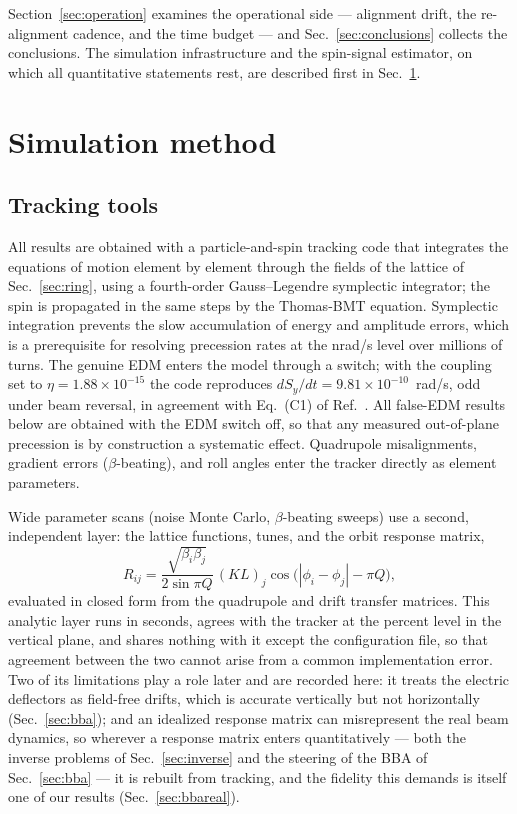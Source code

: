 \documentclass[aps,prab,reprint,superscriptaddress,nofootinbib]{revtex4-2}
\begin{document}
Section~\ref{sec:operation} examines the operational side --- alignment drift,
the re-alignment cadence, and the time budget --- and
Sec.~\ref{sec:conclusions} collects the conclusions.  The simulation
infrastructure and the spin-signal estimator, on which all quantitative
statements rest, are described first in Sec.~\ref{sec:method}.


\section{Simulation method}
\label{sec:method}

\subsection{Tracking tools}
\label{sec:tools}

All results are obtained with a particle-and-spin tracking code that
integrates the equations of motion element by element through the fields of
the lattice of Sec.~\ref{sec:ring}, using a fourth-order Gauss--Legendre
symplectic integrator; the spin is propagated in the same steps by the
Thomas-BMT equation.  Symplectic integration prevents the slow accumulation of
energy and amplitude errors, which is a prerequisite for resolving precession
rates at the nrad/s level over millions of turns.  The genuine EDM enters the
model through a switch; with the coupling set to
$\eta = 1.88\times10^{-15}$ the code reproduces
$dS_y/dt = 9.81\times10^{-10}$~rad/s, odd under beam reversal, in agreement
with Eq.~(C1) of Ref.~\cite{omarov}.  All false-EDM results below are obtained
with the EDM switch off, so that any measured out-of-plane precession is by
construction a systematic effect.  Quadrupole misalignments, gradient errors
($\beta$-beating), and roll angles enter the tracker directly as element
parameters.

Wide parameter scans (noise Monte Carlo, $\beta$-beating sweeps) use a second,
independent layer: the lattice functions, tunes, and the orbit response
matrix,
\begin{equation}
  R_{ij} = \frac{\sqrt{\beta_i\beta_j}}{2\sin\pi Q}\,(KL)_j
  \cos\!\big(|\phi_i-\phi_j| - \pi Q\big),
  \label{eq:R}
\end{equation}
evaluated in closed form from the quadrupole and drift transfer matrices.
This analytic layer runs in seconds, agrees with the tracker at the percent
level in the vertical plane, and shares nothing with it except the
configuration file, so that agreement between the two cannot arise from a
common implementation error.  Two of its limitations play a role later and are
recorded here: it treats the electric deflectors as field-free drifts, which
is accurate vertically but not horizontally (Sec.~\ref{sec:bba}); and an
idealized response matrix can misrepresent the real beam dynamics, so wherever
a response matrix enters quantitatively --- both the inverse problems of
Sec.~\ref{sec:inverse} and the steering of the BBA of Sec.~\ref{sec:bba} --- it
is rebuilt from tracking, and the fidelity this demands is itself one of our
results (Sec.~\ref{sec:bbareal}).
\end{document}

